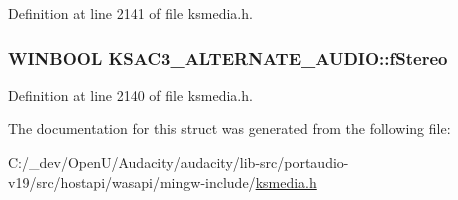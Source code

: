 Definition at line 2141 of file ksmedia.\+h.

\subsubsection[{\texorpdfstring{f\+Stereo}{fStereo}}]{\setlength{\rightskip}{0pt plus 5cm}W\+I\+N\+B\+O\+OL K\+S\+A\+C3\+\_\+\+A\+L\+T\+E\+R\+N\+A\+T\+E\+\_\+\+A\+U\+D\+I\+O\+::f\+Stereo}\hypertarget{struct_k_s_a_c3___a_l_t_e_r_n_a_t_e___a_u_d_i_o_a56f589d27a086677b582e134a340e72c}{}\label{struct_k_s_a_c3___a_l_t_e_r_n_a_t_e___a_u_d_i_o_a56f589d27a086677b582e134a340e72c}


Definition at line 2140 of file ksmedia.\+h.



The documentation for this struct was generated from the following file\+:\begin{DoxyCompactItemize}
\item 
C\+:/\+\_\+dev/\+Open\+U/\+Audacity/audacity/lib-\/src/portaudio-\/v19/src/hostapi/wasapi/mingw-\/include/\hyperlink{ksmedia_8h}{ksmedia.\+h}\end{DoxyCompactItemize}
